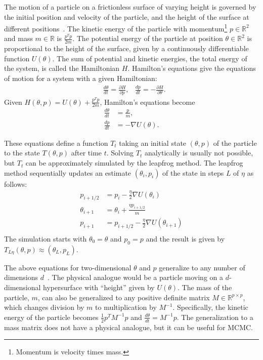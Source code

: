 \documentclass[english,twoside,openright]{HYgraduMLDS}
\newcommand{\R}{\mathbb{R}}
\begin{document}
The motion of a particle on a frictionless surface of varying height is governed 
by the initial position and velocity of the particle, and the height of the 
surface at different positions~\cite{neal2012mcmc}. 
The kinetic energy of the particle with 
momentum\footnote{Momentum is velocity times mass.}
\(p \in \R^{2}\) and mass \(m \in \R\) is \(\frac{p^{T}p}{2m}\). The potential energy of the particle
at position \(\theta \in \R^{2}\) is proportional to the height of the surface, given by
a continuously differentiable function \(U(\theta)\). 
The sum of potential and kinetic energies, the total 
energy of the system, is called the Hamiltonian \(H\). Hamilton's equations 
give the equations of motion for a system with a given Hamiltonian:
\begin{align*}
    &\frac{d\theta}{dt} = \frac{\partial H}{\partial p},
    &\frac{dp}{dt} = -\frac{\partial H}{\partial \theta}.
\end{align*}
Given \(H(\theta, p) = U(\theta) + \frac{p^{T}p}{2m}\), Hamilton's equations become
\begin{align*}
    \frac{d\theta}{dt} &= \frac{p}{m}, \\
    \frac{dp}{dt} &= -\nabla U(\theta).
\end{align*}

These equations define a function \(T_t\) taking an initial state 
\((\theta, p)\) of the particle to the state \(T(\theta, p)\) after time \(t\).
Solving \(T_t\) analytically is usually not possible, but \(T_t\) can be 
approximately simulated by the leapfrog method. The leapfrog method sequentially 
updates an estimate \((\theta_i, p_i)\) of the state in steps \(L\) of \(\eta\) 
as follows:
\begin{align*}
    p_{i+1/2} &= p_i - \frac{\eta}{2}\nabla U(\theta_i) \\
    \theta_{i+1} &= \theta_i + \frac{\eta p_{i+1/2}}{m} \\
    p_{i+1} &= p_{i+1/2} - \frac{\eta}{2}\nabla U(\theta_{i+1}) \\
\end{align*}
The simulation starts with \(\theta_0 = \theta\) and \(p_0 = p\) and the 
result is given by \(T_{L\eta}(\theta, p) \approx (\theta_L, p_L)\).

The above equations for two-dimensional \(\theta\) and \(p\) generalize to
any number of dimensions \(d\)~\cite{neal2012mcmc}. The physical analogue would be a particle moving
on a \(d\)-dimensional hypersurface with ``height'' given by \(U(\theta)\).
The mass of the particle, \(m\), can also be generalized to any positive
definite matrix \(M \in \R^{p\times p}\), which changes division by
\(m\) to multiplication by \(M^{-1}\). Specifically, the kinetic energy of the
particle becomes \(\frac{1}{2}p^{T}M^{-1}p\) and
\(\frac{d\theta}{dt} = M^{-1}p\). The generalization to a mass matrix does not
have a physical analogue, but it can be useful for MCMC.
\end{document}
